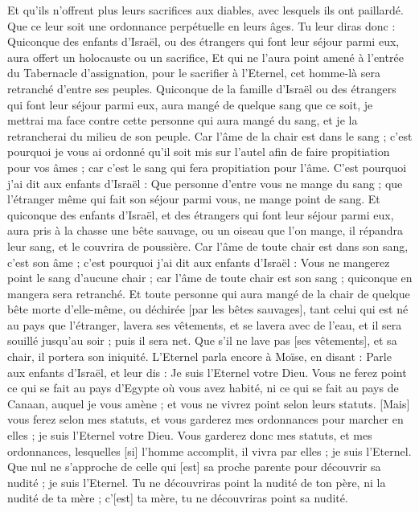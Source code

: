 \begin{multicols}{2}
Et qu'ils n'offrent plus leurs sacrifices aux diables, avec lesquels ils ont paillardé. Que ce leur soit une ordonnance perpétuelle en leurs âges.
Tu leur diras donc : Quiconque des enfants d'Israël, ou des étrangers qui font leur séjour parmi eux, aura offert un holocauste ou un sacrifice,
Et qui ne l'aura point amené à l'entrée du Tabernacle d'assignation, pour le sacrifier à l'Eternel, cet homme-là sera retranché d'entre ses peuples.
Quiconque de la famille d'Israël ou des étrangers qui font leur séjour parmi eux, aura mangé de quelque sang que ce soit, je mettrai ma face contre cette personne qui aura mangé du sang, et je la retrancherai du milieu de son peuple.
Car l'âme de la chair est dans le sang ; c'est pourquoi je vous ai ordonné qu'il soit mis sur l'autel afin de faire propitiation pour vos âmes ; car c'est le sang qui fera propitiation pour l'âme.
C'est pourquoi j'ai dit aux enfants d'Israël : Que personne d'entre vous ne mange du sang ; que l'étranger même qui fait son séjour parmi vous, ne mange point de sang.
Et quiconque des enfants d'Israël, et des étrangers qui font leur séjour parmi eux, aura pris à la chasse une bête sauvage, ou un oiseau que l'on mange, il répandra leur sang, et le couvrira de poussière.
Car l'âme de toute chair est dans son sang, c'est son âme ; c'est pourquoi j'ai dit aux enfants d'Israël : Vous ne mangerez point le sang d'aucune chair ; car l'âme de toute chair est son sang ; quiconque en mangera sera retranché.
Et toute personne qui aura mangé de la chair de quelque bête morte d'elle-même, ou déchirée [par les bêtes sauvages], tant celui qui est né au pays que l'étranger, lavera ses vêtements, et se lavera avec de l'eau, et il sera souillé jusqu'au soir ; puis il sera net.
Que s'il ne lave pas [ses vêtements], et sa chair, il portera son iniquité.
\VerseOne{}L'Eternel parla encore à Moïse, en disant :
Parle aux enfants d'Israël, et leur dis : Je suis l'Eternel votre Dieu.
Vous ne ferez point ce qui se fait au pays d'Egypte où vous avez habité, ni ce qui se fait au pays de Canaan, auquel je vous amène ; et vous ne vivrez point selon leurs statuts.
[Mais] vous ferez selon mes statuts, et vous garderez mes ordonnances pour marcher en elles ; je suis l'Eternel votre Dieu.
Vous garderez donc mes statuts, et mes ordonnances, lesquelles [si] l'homme accomplit, il vivra par elles ; je suis l'Eternel.
Que nul ne s'approche de celle qui [est] sa proche parente pour découvrir sa nudité ; je suis l'Eternel.
Tu ne découvriras point la nudité de ton père, ni la nudité de ta mère ; c'[est] ta mère, tu ne découvriras point sa nudité.

\end{multicols}

